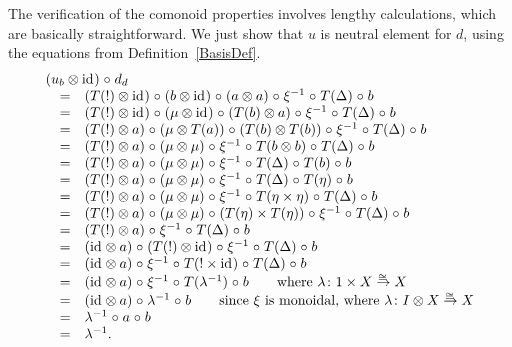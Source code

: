 \documentclass{LMCS}
\newcommand{\after}{\mathrel{\circ}}
\newcommand{\idmap}[1][]{\ensuremath{\mathrm{id}_{#1}}}
\newcommand{\congrightarrow}{\mathrel{\stackrel{
           \raisebox{.5ex}{$\scriptstyle\cong\,$}}{
           \raisebox{0ex}[0ex][0ex]{$\rightarrow$}}}}
\begin{document}
{The verification of the comonoid properties involves lengthy
calculations, which are basically straightforward. We just show that
$u$ is neutral element for $d$, using the equations from
Definition~\ref{BasisDef}.
$$\begin{array}{rcl}
\lefteqn{(u_{b}\otimes\idmap) \after d_{d}} \\
& = &
(T(!)\otimes\idmap) \after (b\otimes\idmap) \after (a \otimes a) 
   \after \xi^{-1} \after T(\Delta) \after b \\
& = &
(T(!)\otimes\idmap) \after (\mu\otimes\idmap) \after (T(b)\otimes a) 
   \after \xi^{-1} \after T(\Delta) \after b \\
& = &
(T(!)\otimes a) \after (\mu\otimes T(a)) \after (T(b)\otimes T(b)) 
   \after \xi^{-1} \after T(\Delta) \after b \\
& = &
(T(!)\otimes a) \after (\mu\otimes \mu) \after \xi^{-1} \after 
   T(b\otimes b) \after T(\Delta) \after b \\
& = &
(T(!)\otimes a) \after (\mu\otimes \mu) \after \xi^{-1} 
   \after T(\Delta) \after T(b) \after b \\
& = &
(T(!)\otimes a) \after (\mu\otimes \mu) \after \xi^{-1} 
   \after T(\Delta) \after T(\eta) \after b \\
& = &
(T(!)\otimes a) \after (\mu\otimes \mu) \after \xi^{-1} \after 
   T(\eta\times \eta) \after T(\Delta) \after b \\
& = &
(T(!)\otimes a) \after (\mu\otimes \mu) \after (T(\eta)\times T(\eta)) \after 
   \xi^{-1} \after T(\Delta) \after b \\
& = &
(T(!)\otimes a) \after \xi^{-1} \after T(\Delta) \after b \\
& = &
(\idmap\otimes a) \after (T(!)\otimes \idmap) \after \xi^{-1} 
   \after T(\Delta) \after b \\
& = &
(\idmap\otimes a) \after \xi^{-1} \after T(!\times \idmap) 
   \after T(\Delta) \after b \\
& = &
(\idmap\otimes a) \after \xi^{-1} \after T(\lambda^{-1}) \after b 
   \qquad \mbox{where }\lambda\colon 1\times X \congrightarrow X \\
& = &
(\idmap\otimes a) \after \lambda^{-1} \after b 
   \qquad \mbox{since $\xi$ is monoidal, where $\lambda \colon 
   I \otimes X  \congrightarrow X$} \\
& = &
\lambda^{-1} \after a \after b \\
& = &
\lambda^{-1}.
\end{array}$$

}
\end{document}

